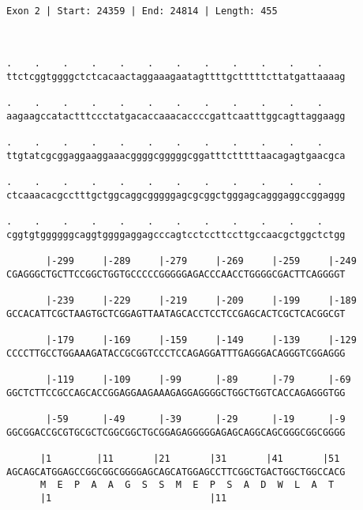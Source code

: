 \documentclass{article}
\begin{document}
 \begin{Verbatim}
 
Exon 2 | Start: 24359 | End: 24814 | Length: 455



.    .    .    .    .    .    .    .    .    .    .    .    
ttctcggtggggctctcacaactaggaaagaatagttttgctttttcttatgattaaaag
                                                            
.    .    .    .    .    .    .    .    .    .    .    .    
aagaagccatactttccctatgacaccaaacaccccgattcaatttggcagttaggaagg
                                                            
.    .    .    .    .    .    .    .    .    .    .    .    
ttgtatcgcggaggaaggaaacggggcgggggcggatttctttttaacagagtgaacgca
                                                            
.    .    .    .    .    .    .    .    .    .    .    .    
ctcaaacacgcctttgctggcaggcgggggagcgcggctgggagcagggaggccggaggg
                                                            
.    .    .    .    .    .    .    .    .    .    .    .    
cggtgtggggggcaggtggggaggagcccagtcctccttccttgccaacgctggctctgg
                                                            
       |-299     |-289     |-279     |-269     |-259     |-249
CGAGGGCTGCTTCCGGCTGGTGCCCCCGGGGGAGACCCAACCTGGGGCGACTTCAGGGGT
                                                            
       |-239     |-229     |-219     |-209     |-199     |-189
GCCACATTCGCTAAGTGCTCGGAGTTAATAGCACCTCCTCCGAGCACTCGCTCACGGCGT
                                                            
       |-179     |-169     |-159     |-149     |-139     |-129
CCCCTTGCCTGGAAAGATACCGCGGTCCCTCCAGAGGATTTGAGGGACAGGGTCGGAGGG
                                                            
       |-119     |-109     |-99      |-89      |-79      |-69
GGCTCTTCCGCCAGCACCGGAGGAAGAAAGAGGAGGGGCTGGCTGGTCACCAGAGGGTGG
                                                            
       |-59      |-49      |-39      |-29      |-19      |-9
GGCGGACCGCGTGCGCTCGGCGGCTGCGGAGAGGGGGAGAGCAGGCAGCGGGCGGCGGGG
                                                            
      |1        |11       |21       |31       |41       |51 
AGCAGCATGGAGCCGGCGGCGGGGAGCAGCATGGAGCCTTCGGCTGACTGGCTGGCCACG
      M  E  P  A  A  G  S  S  M  E  P  S  A  D  W  L  A  T  
      |1                            |11                     
  

\end{Verbatim}
\end{document}
